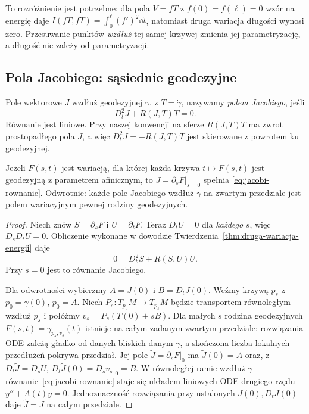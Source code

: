 To rozróżnienie jest potrzebne: dla pola
$V=fT$ z $f(0)=f(\ell)=0$ wzór na energię
daje $I(fT,fT)=\int_0^\ell(f')^2\dd t$,
natomiast druga wariacja długości wynosi
zero. Przesuwanie punktów \emph{wzdłuż} tej
samej krzywej zmienia jej parametryzację,
a długość nie zależy od parametryzacji.

\subsection*{Pola Jacobiego: sąsiednie geodezyjne}

\begin{definicja}
\label{def:pole-jacobiego}
Pole wektorowe $J$ wzdłuż geodezyjnej
$\gamma$, z $T=\dot\gamma$, nazywamy
\emph{polem Jacobiego}, jeśli
\begin{equation}\label{eq:jacobi-rownanie}
 D_t^2J+R(J,T)T=0.
\end{equation}
Równanie jest liniowe. Przy naszej konwencji
na sferze $R(J,T)T$ ma zwrot prostopadłego
pola $J$, a więc $D_t^2J=-R(J,T)T$
jest skierowane z powrotem ku geodezyjnej.
\end{definicja}

\begin{twierdzenie}
\label{thm:jacobi-wariacja-geodezyjnych}
Jeżeli $F(s,t)$ jest wariacją, dla której
każda krzywa $t\mapsto F(s,t)$ jest
geodezyjną z parametrem afinicznym, to
$J=\partial_sF|_{s=0}$ spełnia
\eqref{eq:jacobi-rownanie}. Odwrotnie:
każde pole Jacobiego wzdłuż $\gamma$ na
zwartym przedziale jest polem wariacyjnym
pewnej rodziny geodezyjnych.
\end{twierdzenie}
\begin{proof}
Niech znów $S=\partial_sF$ i $U=\partial_tF$.
Teraz $D_tU=0$ dla \emph{każdego} $s$,
więc $D_sD_tU=0$. Obliczenie wykonane
w dowodzie Twierdzenia~\ref{thm:druga-wariacja-energii}
daje
\[
 0=D_t^2S+R(S,U)U.
\]
Przy $s=0$ jest to równanie Jacobiego.

Dla odwrotności wybierzmy
$A=J(0)$ i $B=D_tJ(0)$.
Weźmy krzywą $p_s$ z $p_0=\gamma(0)$,
$\dot p_0=A$. Niech $P_s:T_{p_0}M\to T_{p_s}M$
będzie transportem równoległym wzdłuż $p_s$
i połóżmy $v_s=P_s(T(0)+sB)$.
Dla małych $s$ rodzina geodezyjnych
$F(s,t)=\gamma_{p_s,v_s}(t)$ istnieje na
całym zadanym zwartym przedziale: rozwiązania
ODE zależą gładko od danych bliskich danym
$\gamma$, a skończona liczba lokalnych
przedłużeń pokrywa przedział.
Jej pole $\widetilde J=\partial_sF|_0$
ma $\widetilde J(0)=A$ oraz, z
$D_t\widetilde J=D_sU$,
$D_t\widetilde J(0)=D_s v_s|_0=B$.
W równoległej ramie wzdłuż $\gamma$
równanie~\eqref{eq:jacobi-rownanie} staje się
układem liniowych ODE drugiego rzędu
$y''+A(t)y=0$. Jednoznaczność rozwiązania
przy ustalonych $J(0),D_tJ(0)$ daje
$\widetilde J=J$ na całym przedziale.
\end{proof}

